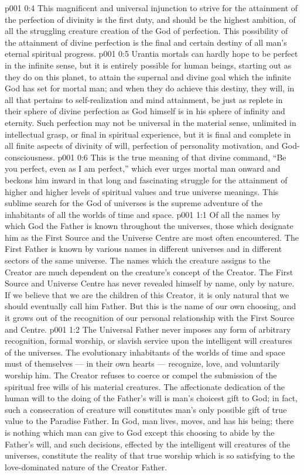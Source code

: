 \vs p001 0:4 This magnificent and universal injunction to strive for the attainment of the perfection of divinity is the first duty, and should be the highest ambition, of all the struggling creature creation of the God of perfection. This possibility of the attainment of divine perfection is the final and certain destiny of all man’s eternal spiritual progress.
\vs p001 0:5 Urantia mortals can hardly hope to be perfect in the infinite sense, but it is entirely possible for human beings, starting out as they do on this planet, to attain the supernal and divine goal which the infinite God has set for mortal man; and when they do achieve this destiny, they will, in all that pertains to self\hyp{}realization and mind attainment, be just as replete in their sphere of divine perfection as God himself is in his sphere of infinity and eternity. Such perfection may not be universal in the material sense, unlimited in intellectual grasp, or final in spiritual experience, but it is final and complete in all finite aspects of divinity of will, perfection of personality motivation, and God\hyp{}consciousness.
\vs p001 0:6 This is the true meaning of that divine command, “Be you perfect, even as I am perfect,” which ever urges mortal man onward and beckons him inward in that long and fascinating struggle for the attainment of higher and higher levels of spiritual values and true universe meanings. This sublime search for the God of universes is the supreme adventure of the inhabitants of all the worlds of time and space.
\vs p001 1:1 Of all the names by which God the Father is known throughout the universes, those which designate him as the First Source and the Universe Centre are most often encountered. The First Father is known by various names in different universes and in different sectors of the same universe. The names which the creature assigns to the Creator are much dependent on the creature’s concept of the Creator. The First Source and Universe Centre has never revealed himself by name, only by nature. If we believe that we are the children of this Creator, it is only natural that we should eventually call him Father. But this is the name of our own choosing, and it grows out of the recognition of our personal relationship with the First Source and Centre.
\vs p001 1:2 The Universal Father never imposes any form of arbitrary recognition, formal worship, or slavish service upon the intelligent will creatures of the universes. The evolutionary inhabitants of the worlds of time and space must of themselves --- in their own hearts --- recognize, love, and voluntarily worship him. The Creator refuses to coerce or compel the submission of the spiritual free wills of his material creatures. The affectionate dedication of the human will to the doing of the Father’s will is man’s choicest gift to God; in fact, such a consecration of creature will constitutes man’s only possible gift of true value to the Paradise Father. In God, man lives, moves, and has his being; there is nothing which man can give to God except this choosing to abide by the Father’s will, and such decisions, effected by the intelligent will creatures of the universes, constitute the reality of that true worship which is so satisfying to the love\hyp{}dominated nature of the Creator Father.
